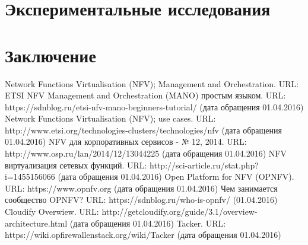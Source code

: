 \documentclass[oneside,final,14pt,a4paper]{extreport}
\begin{document}
\chapter{Экспериментальные исследования}

\chapter*{Заключение}


\begin{thebibliography}{00}
 Network Functions Virtualisation (NFV); Management and Orchestration. URL: %
 ETSI NFV Management and Orchestration (MANO) простым языком. URL: https://sdnblog.ru/etsi-nfv-mano-beginners-tutorial/ (дата обращения 01.04.2016)
 Network Functions Virtualisation (NFV); use cases. URL: http://www.etsi.org/technologies-clusters/technologies/nfv (дата обращения 01.04.2016)
 NFV для корпоративных сервисов - № 12, 2014. URL: http://www.osp.ru/lan/2014/12/13044225 (дата обращения 01.04.2016)
 NFV виртуализация сетевых функций. URL: http://sci-article.ru/stat.php?i=1455156066 (дата обращения 01.04.2016)
 Open Platform for NFV (OPNFV). URL: https://www.opnfv.org (дата обращения 01.04.2016)
 Чем занимается сообщество OPNFV? URL:  https://sdnblog.ru/who-is-opnfv/ (01.04.2016)
 Cloudify Overwiew. URL: http://getcloudify.org/guide/3.1/overview-architecture.html (дата обращения 01.04.2016)
 Tacker. URL: https://wiki.opfirewallenstack.org/wiki/Tacker (дата обращения 01.04.2016)
\end{thebibliography}

\end{document}
